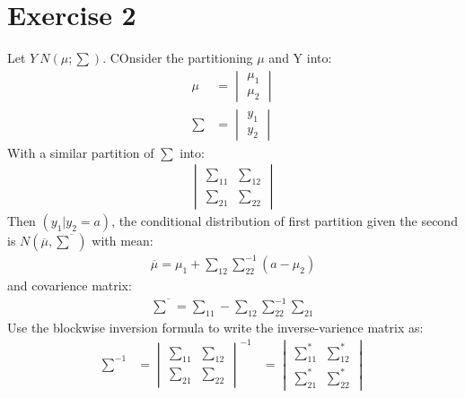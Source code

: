\documentclass{article}
\begin{document}
\section{Exercise 2}
Let $Y~N(\mu; \sum)$. COnsider the partitioning $\mu$ and Y into:\\
\begin{align*}
    \mu & = 
    \begin{vmatrix}
        \displaystyle{\mu_1}\\
        \displaystyle{\mu_2}
    \end{vmatrix} \\
    \sum & = 
    \begin{vmatrix}
        \displaystyle{y_1}\\
        \displaystyle{y_2}
    \end{vmatrix}
\end{align*} 
With a similar partition of $\sum$ into:\\
\begin{align*}
    \begin{vmatrix}
    \displaystyle{\sum_{11}} &
    \displaystyle{\sum_{12}}\\
    \displaystyle{\sum_{21}} &
    \displaystyle{\sum_{22}}
\end{vmatrix}
\end{align*}
Then $(y_1|y_2 = a)$, the conditional distribution of first partition given the second is $N(\overline{\mu}, \overline{\sum})$ with mean:\\
\begin{align*}
    \overline{\mu} = \mu_1 + \sum_{12}\sum_{22}^{-1}(a-\mu_2)
\end{align*}
and covarience matrix:\\
\begin{align*}
    \overline{\sum} = \sum_{11} - \sum_{12}\sum_{22}^{-1}\sum_{21}
\end{align*}
Use the blockwise inversion formula to write the inverse-varience matrix as:\\
\begin{eqnarray*}
    \sum^{-1} & =
    {\begin{vmatrix}
       \displaystyle{\sum_{11}} &
        \displaystyle{\sum_{12}}\\
        \displaystyle{\sum_{21}} &
        \displaystyle{\sum_{22}}
    \end{vmatrix}} ^{-1}
    & =
     \begin{vmatrix}
       \displaystyle{\sum_{11}^*} &
        \displaystyle{\sum_{12}^*}\\
        \displaystyle{\sum_{21}^*} &
        \displaystyle{\sum_{22}^*}
    \end{vmatrix}
\end{eqnarray*}
\end{document}
